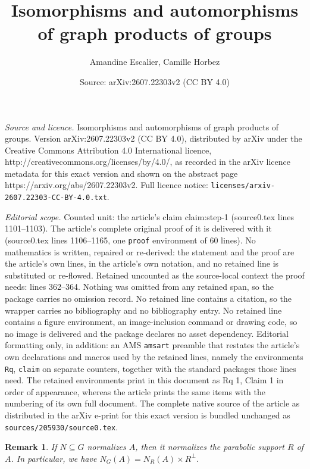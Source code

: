 \documentclass[10pt,a4paper]{amsart}
\title{Isomorphisms and automorphisms of graph products of groups}
\author{Amandine Escalier, Camille Horbez}
\date{Source: arXiv:2607.22303v2 (CC BY 4.0)}
\newtheorem{Rq}{Remark}
\begin{document}
\maketitle

\noindent\emph{Source and licence.} Isomorphisms and automorphisms of graph products of groups. Version arXiv:2607.22303v2 (CC BY 4.0), distributed by arXiv under the Creative Commons Attribution 4.0 International licence, http://creativecommons.org/licenses/by/4.0/, as recorded in the arXiv licence metadata for this exact version and shown on the abstract page https://arxiv.org/abs/2607.22303v2. Full licence notice: \texttt{licenses/arxiv-2607.22303-CC-BY-4.0.txt}.\par\smallskip

\noindent\textit{Editorial scope.} Counted unit: the article's claim claim:step-1 (source0.tex lines 1101--1103). The article's complete original proof of it is delivered with it (source0.tex lines 1106--1165, one \texttt{proof} environment of 60 lines). No mathematics is written, repaired or re-derived: the statement and the proof are the article's own lines, in the article's own notation, and no retained line is substituted or re-flowed.  Retained uncounted as the source-local context the proof needs: lines 362--364.  Nothing was omitted from any retained span, so the package carries no omission record.  No retained line contains a citation, so the wrapper carries no bibliography and no bibliography entry.  No retained line contains a figure environment, an image-inclusion command or drawing code, so no image is delivered and the package declares no asset dependency.  Editorial formatting only, in addition: an AMS \texttt{amsart} preamble that restates the article's own declarations and macros used by the retained lines, namely the environments \texttt{Rq}, \texttt{claim} on separate counters, together with the standard packages those lines need.  The retained environments print in this document as Rq 1, Claim 1 in order of appearance, whereas the article prints the same items with the numbering of its own full document.  The complete native source of the article as distributed in the arXiv e-print for this exact version is bundled unchanged as \texttt{sources/205930/source0.tex}.
\begin{Rq}\label{Fact:Normalizer-support}
    If $N\subseteq G$ normalizes $A$, then it normalizes the parabolic support $R$ of $A$. In particular, we have $N_G(A)=N_R(A)\times R^\perp$.
\end{Rq}
\end{document}
